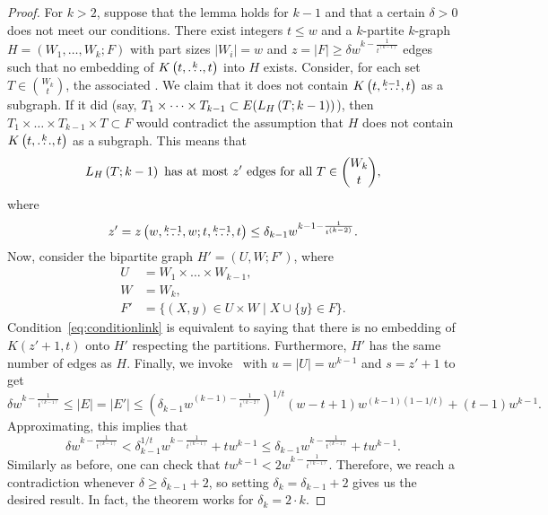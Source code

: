 \begin{lemma}
\begin{proof}
        For $k > 2$, suppose that the lemma holds for $k - 1$ and that
        a certain $\delta > 0$ does not meet our conditions.
        There exist integers $t \leq w$ and a $k$-partite $k$-graph $H=(W_1, \dots, W_k; F)$
        with part sizes $|W_i| = w$ and $z = |F| \geq \delta w^{k - \frac{1}{t^{(k-1)}}}$ edges
        such that no embedding of $K\left(t, \overset{k}{\dots}, t\right)$ into $H$ exists.
        Consider, for each set $T \in \binom{W_k}{t}$, the associated 
        .
        We claim that it does not contain $K\left(t, \overset{k-1}{\dots}, t\right)$ as a subgraph.
        If it did (say, $T_1 \times \dots \times T_{k-1} \subset E(L_{H}\left(T; k-1\right))$),
        then $T_1 \times \dots \times T_{k-1} \times T \subset F$
        would contradict the assumption that $H$ does not contain $K\left(t, \overset{k}{\dots}, t\right)$ as a subgraph.
        This means that
        \begin{equation} \label{eq:conditionlink}
            L_{H}\left(T; k-1\right) \text{ has at most $z'$ edges for all } T \in \binom{W_k}{t},
        \end{equation}
        where
        \[
            z' = z\left(w, \overset{k-1}{\dots}, w; t, \overset{k-1}{\dots}, t\right) \leq \delta_{k-1} w^{k - 1 - \frac{1}{t^{(k-2)}}}.
        \]
        Now, consider the bipartite graph $H' = (U, W; F')$, where
        \begin{align*}
            U &= W_1 \times \dots \times W_{k-1}, \\
            W &= W_k, \\
            F' &= \{(X, y) \in U \times W \mid X \cup \{y\} \in F\}.
        \end{align*}
        Condition~\eqref{eq:conditionlink} is equivalent to saying that
        there is no embedding of $K(z' + 1, t)$ onto $H'$ respecting the partitions.
        Furthermore, $H'$ has the same number of edges as $H$.
        Finally, we invoke~ with
        ${u = |U| = w^{k-1}}$ and
        ${s = z' + 1}$ to get
        \begin{equation} \label{eq:erdos64_induction}
            \delta w^{k - \frac{1}{t^{(k-1)}}} \leq
            |E| = |E'| \leq
            \left(\delta_{k-1} w^{(k - 1) - \frac{1}{t^{(k-2)}}}\right)^{1 / t}(w - t + 1)w^{(k-1)(1 - 1 / t)} + (t - 1)w^{k-1}.
        \end{equation}
        Approximating, this implies that
        \[
            \delta w^{k - \frac{1}{t^{(k-1)}}} < \delta_{k-1}^{1 / t} w^{k - \frac{1}{t^{(k-1)}}} + tw^{k-1} \leq \delta_{k-1}w^{k - \frac{1}{t^{(k-1)}}} + tw^{k-1}.
        \]
        Similarly as before, one can check that $tw^{k-1} < 2w^{k-\frac{1}{t^{(k-1)}}}$.
        Therefore, we reach a contradiction whenever $\delta \geq \delta_{k-1} + 2$,
        so setting $\delta_k = \delta_{k-1} + 2$ gives us the desired result.
        In fact, the theorem works for $\delta_k = 2 \cdot k$.
    \end{proof}
\end{lemma}

